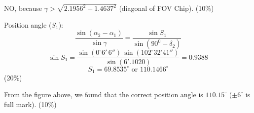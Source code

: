 \begin{description}
NO, because $\gamma > \sqrt{2.1956^2 + 1.4637^2}$ (diagonal of FOV Chip).
\hfill(10\%)

\item[b.] Position angle ($S_1$):
\[
\frac{\sin(\alpha_2 - \alpha_1)}{\sin\gamma}
 = \frac{\sin S_1}{\sin(90^0 - \delta_2)}
\]
\[
\sin S_1 = \frac{\sin(0^\circ 6'\,6'')\,\sin(102^\circ 32'41'')}{\sin(6'.1020)}
 = 0.9388
\]
\[
S_1 = 69.8535^\circ \text{ or } 110.1466^\circ
\]
\hfill(20\%)

From the figure above, we found that the correct position angle is
$110.15^\circ$ ($\pm 6^\circ$ is full mark). \hfill(10\%)
\end{description}
